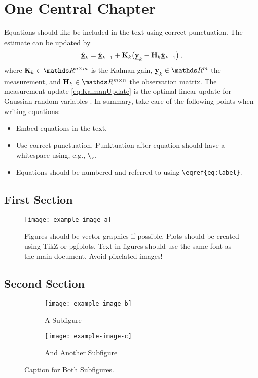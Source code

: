 \documentclass[english,algorithms,reviews,examples,MA]{amsthesis}
\begin{document}
    \chapter{One Central Chapter}
    \lipsum[11]
    
    Equations should like be included in the text using correct punctuation. The estimate can be updated by
    \begin{equation}
        {\ensuremath{\hat{{{\boldsymbol{\mathrm{{\underline{x}}}}}}} }}_{k} = {\hat{{{\boldsymbol{\mathrm{{\underline{x}}}}}}} }_{k-1} + {{\mathbf{K}}}_k \bigl({{\boldsymbol{\mathrm{{\underline{y}}}}}}_k - {{\mathbf{H}}}_k {\hat{{{\boldsymbol{\mathrm{{\underline{x}}}}}}} }_{k-1} \bigr) \, , \label{eq:KalmanUpdate}
    \end{equation}
    where $\mat{K}_k\in\IR^{n\times m}$ is the Kalman gain, $\rvec{y}_k\in\IR^m$ the measurement, and $\mat{H}_k\in\IR^{m\times n}$ the observation matrix. The measurement update \eqref{eq:KalmanUpdate} is the optimal linear update for Gaussian random variables \cite{Anderson1979}.
    In summary, take care of the following points when writing equations:
    \begin{itemize}
    \item Embed equations in the text.
    \item Use correct punctuation. Punktuation after equation should have a whitespace using, e.g., \verb|\,|.
    \item Equations should be numbered and referred to using \verb|\eqref{eq:label}|.
    \end{itemize}

    \section{First Section}
    \lipsum[11]
    \begin{figure}[h]
        \texttt{[image: example-image-a]}
        \caption[A short description for the List of Figures.]{Figures should be vector graphics if possible. Plots should be created using TikZ or pgfplots. Text in figures should use the same font as the main document. Avoid pixelated images!}
    \end{figure}

    \lipsum[11-13]

    \section{Second Section}
    \lipsum[11]
    \begin{figure}
        \begin{subfigure}{0.5\textwidth}
            \centering
            \texttt{[image: example-image-b]}
            \caption{A Subfigure}
        \end{subfigure}
        \begin{subfigure}{0.5\textwidth}
            \centering
            \texttt{[image: example-image-c]}
            \caption{And Another Subfigure}
        \end{subfigure}
        \caption{Caption for Both Subfigures.}        
    \end{figure}
    \lipsum[11]   
\end{document}
